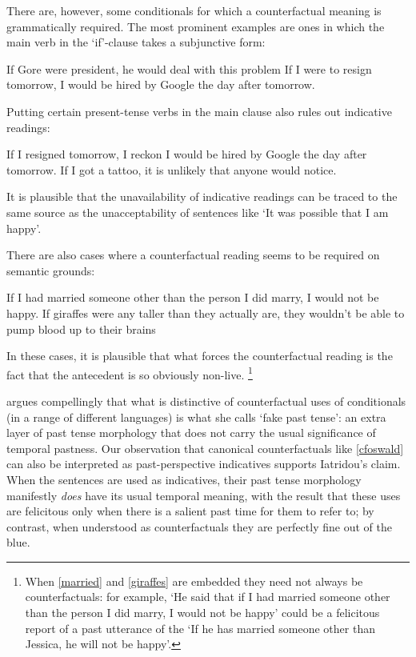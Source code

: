 \documentclass[If.tex]{subfiles}
\begin{document}
There are, however, some conditionals for which a counterfactual meaning is grammatically required. The most prominent examples are ones in which the main verb in the ‘if’-clause takes a subjunctive form:
\begin{prop}
	\nitem 
		\begin{prop}
			\aitem
			If Gore were president, he would deal with this problem
			\aitem 
			If I were to resign tomorrow, I would be hired by Google the day after tomorrow.
		\end{prop}
\end{prop}
Putting certain present-tense verbs in the main clause also rules out indicative readings:
\begin{prop}
	\nitem
	\begin{prop}
		\aitem
		If I resigned tomorrow, I reckon I would be hired by Google the day after tomorrow.
		\aitem 
		If I got a tattoo, it is unlikely that anyone would notice.
	\end{prop}
\end{prop}
It is plausible that the unavailability of indicative readings can be traced to the same source as the unacceptability of sentences like ‘It was possible that I am happy’.

There are also cases where a counterfactual reading seems to be required on semantic grounds:
\begin{prop}
	\nitem 
	\begin{prop}
		\aitem\label{married}
		If I had married someone other than the person I did marry, I would not be happy.
		\aitem \label{giraffes}
		If giraffes were any taller than they actually are, they wouldn't be able to pump blood up to their brains
	\end{prop}
\end{prop}
In these cases, it is plausible that what forces the counterfactual reading is the fact that the antecedent is so obviously non-live.%
\footnote{When \ref{married} and \ref{giraffes} are embedded they need not always be counterfactuals: for example, ‘He said that if I had married someone other than the person I did marry, I would not be happy’ could be a felicitous report of a past utterance of the ‘If he has married someone other than Jessica, he will not be happy’.}

\citet{IatridouGIC} argues compellingly that what is distinctive of counterfactual uses of conditionals (in a range of different languages) is what she calls ‘fake past tense’: an extra layer of past tense morphology that does not carry the usual significance of temporal pastness.  Our observation that canonical counterfactuals like \ref{cfoswald} can also be interpreted as past-perspective indicatives supports Iatridou's claim.  When the sentences are used as indicatives, their past tense morphology manifestly \emph{does} have its usual temporal meaning, with the result that these uses are felicitous only when there is a salient past time for them to refer to; by contrast, when understood as counterfactuals they are perfectly fine out of the blue.  
\end{document}
